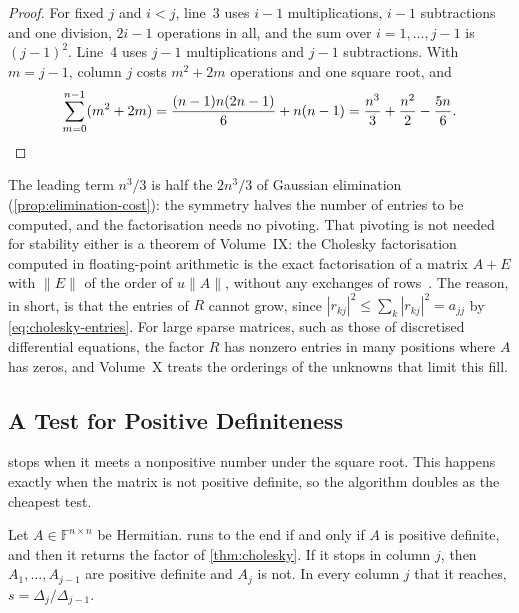 \begin{proof}
For fixed $j$ and $i<j$, line~3 uses $i-1$ multiplications, $i-1$ subtractions and one division, $2i-1$ operations in all, and the sum over $i=1,\ldots,j-1$ is $(j-1)^2$. Line~4 uses $j-1$ multiplications and $j-1$ subtractions. With $m=j-1$, column $j$ costs $m^2+2m$ operations and one square root, and
\[
\sum_{m=0}^{n-1}(m^2+2m)=\frac{(n-1)n(2n-1)}6+n(n-1)=\frac{n^3}3+\frac{n^2}2-\frac{5n}6 .\qedhere
\]
\end{proof}

The leading term $n^3/3$ is half the $2n^3/3$ of Gaussian elimination (\cref{prop:elimination-cost}): the symmetry halves the number of entries to be computed, and the factorisation needs no pivoting. That pivoting is not needed for stability either is a theorem of Volume~IX: the Cholesky factorisation computed in floating-point arithmetic is the exact factorisation of a matrix $A+E$ with $\|E\|$ of the order of $u\|A\|$, without any exchanges of rows~\cite[Chap.~10]{higham2002accuracy}. The reason, in short, is that the entries of $R$ cannot grow, since $|r_{kj}|^2\le\sum_k|r_{kj}|^2=a_{jj}$ by \eqref{eq:cholesky-entries}. For large sparse matrices, such as those of discretised differential equations, the factor $R$ has nonzero entries in many positions where $A$ has zeros, and Volume~X treats the orderings of the unknowns that limit this fill.

\subsection{A Test for Positive Definiteness}

 stops when it meets a nonpositive number under the square root. This happens exactly when the matrix is not positive definite, so the algorithm doubles as the cheapest test.

\begin{proposition}
\label{prop:cholesky-test}
Let $A\in\mathbb F^{n\times n}$ be Hermitian.  runs to the end if and only if $A$ is positive definite, and then it returns the factor of \cref{thm:cholesky}. If it stops in column $j$, then $A_1,\ldots,A_{j-1}$ are positive definite and $A_j$ is not. In every column $j$ that it reaches, $s=\Delta_j/\Delta_{j-1}$.
\end{proposition}

